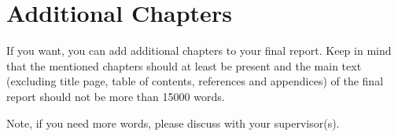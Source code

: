 \chapter{Additional Chapters}\label{chap:additional_chapters}

If you want, you can add additional chapters to your final report. Keep in mind that the mentioned chapters should at least be present and the main text (excluding title page, table of contents, references and appendices) of the final report should not be more than 15000 words.

Note, if you need more words, please discuss with your supervisor(s).